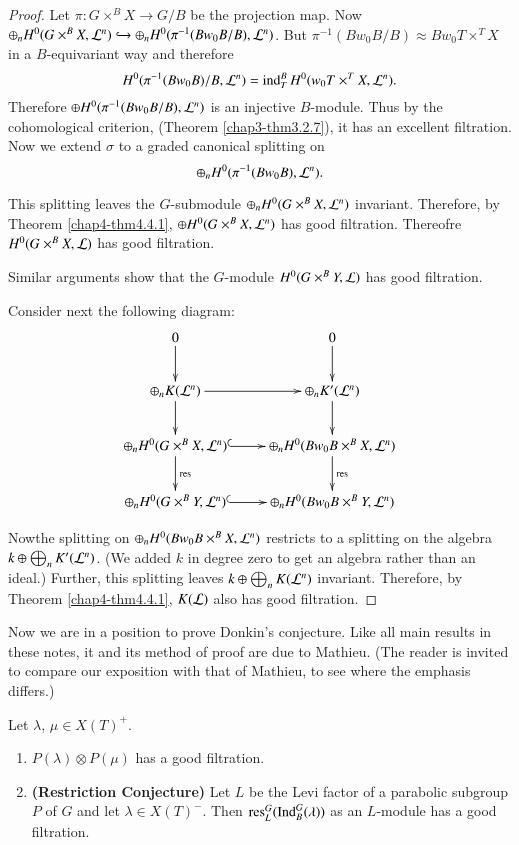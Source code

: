 \begin{proof}
Let $\pi:G\times^{B}X\to G/B$ be the projection map. Now
$\oplus_{n}H^{0}(G\times^{B}X,\mathcal{L}^{n})\hookrightarrow
\oplus_{n}H^{0}(\pi^{-1}(Bw_{0}B/B),\mathcal{L}^{n})$. But
$\pi^{-1}(Bw_{0}B/B)\approx Bw_{0}T\times^{T}X$ in a $B$-equivariant
way and therefore
$$
H^{0}(\pi^{-1}(Bw_{0}B)/B,\mathcal{L}^{n})=\operatorname{ind}^{B}_{T}H^{0}(w_{0}T\times^{T}X,\mathcal{L}^{n}).
$$ 
Therefore
$\oplus H^{0}(\pi^{-1}(Bw_{0}B/B),\mathcal{L}^{n})$ is an injective
$B$-module. Thus by the cohomological criterion, (Theorem
\ref{chap3-thm3.2.7}), it has an excellent filtration. Now we extend
$\sigma$ to a graded canonical splitting on
$$
\oplus_{n}H^{0}(\pi^{-1}(Bw_{0}B),\mathcal{L}^{n}).
$$ 

This splitting leaves the
$G$-submodule $\oplus_{n}H^{0}(G\times^{B}X,\mathcal{L}^{n})$
invariant. Therefore, by Theorem \ref{chap4-thm4.4.1}, $\oplus
H^{0}(G\times^{B}X,\mathcal{L}^{n})$ has good filtration. Thereofre
$H^{0}(G\times^{B}X,\mathcal{L})$ has good filtration.

Similar arguments show that the $G$-module $H^{0}(G\times^{B}Y,\mathcal{L})$
has good filtration.

Consider next the following diagram:
\[
\xymatrix{
0\ar[d] & 0\ar[d]\\
\oplus_{n}K(\L^{n})\ar[r]\ar[d] & \oplus_{n}K'(\L^{n})\ar[d]\\
\oplus_{n}H^{0}(G\times^{B}X,\L^{n})\ar@{^(->}[r]\ar[d]^{\res} &
\oplus_{n}H^{0}(Bw_{0}B\times^{B}X,\L^{n})\ar[d]^{\res}\\
\oplus_{n}H^{0}(G\times^{B}Y,\L^{n})\ar@{^(->}[r] &
\oplus_{n}H^{0}(Bw_{0}B\times^{B}Y,\L^{n}) 
}
\]

Now\pageoriginale the\label{page47} splitting on
$\oplus_{n}H^{0}(Bw_{0}B\times^{B}X,\mathcal{L}^{n})$ restricts to a splitting
on the algebra $k\oplus\bigoplus_{n}K'(\mathcal{L}^{n})$. (We added $k$ in
degree zero to get an algebra rather than an ideal.) Further, this
splitting leaves $k\oplus\bigoplus_{n}K(\mathcal{L}^{n})$ invariant. Therefore,
by Theorem \ref{chap4-thm4.4.1}, $K(\mathcal{L})$ also has good filtration.
\end{proof}

Now we are in a position to prove Donkin's conjecture. Like all main
results in these notes, it and its method of proof are due to
Mathieu. (The reader is invited to compare our exposition with that of
Mathieu, to see where the emphasis differs.)

\begin{theorem}\label{chap4-theo4.4.3}
Let $\lambda$, $\mu\in X(T)^{+}$.
\begin{enumerate}
\item $P(\lambda)\otimes P(\mu)$ has a good filtration.

\item {\bf(Restriction Conjecture)} 
  Let $L$ be the Levi factor of a
  parabolic subgroup $P$ of $G$ and let $\lambda\in X(T)^{-}$. Then
  $\operatorname{res}^{G}_{L}(\operatorname{Ind}^{G}_{B}(\lambda))$ as an $L$-module has a good
  filtration. 
\end{enumerate}
\end{theorem}

